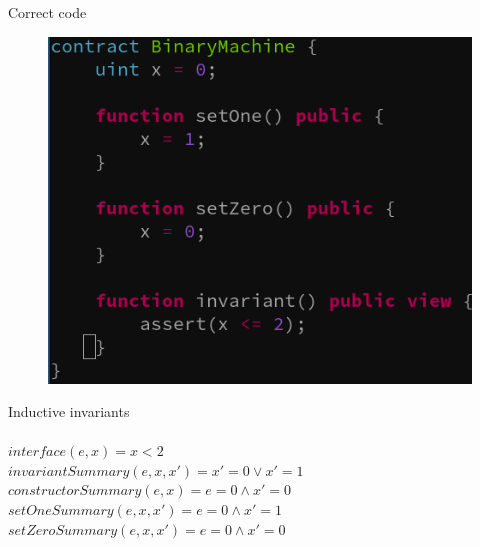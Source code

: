 \documentclass[aspectratio=169,10pt]{beamer}
\begin{document}
\begin{frame}[fragile]
\begin{center}
Correct code
\begin{figure}
	\includegraphics[scale=0.4]{images/binary_machine_code_pass}
\end{figure}
\end{center}
\end{frame}

\begin{frame}[fragile]
\begin{center}
Inductive invariants\\
\;\\
$interface(e, x) = x < 2$\\
$invariantSummary(e, x, x') = x' = 0 \lor x' = 1$\\
$constructorSummary(e, x) = e = 0 \land x' = 0$\\
$setOneSummary(e, x, x') = e = 0 \land x' = 1$\\
$setZeroSummary(e, x, x') = e = 0 \land x' = 0$\\
\end{center}
\end{frame}
\end{document}

